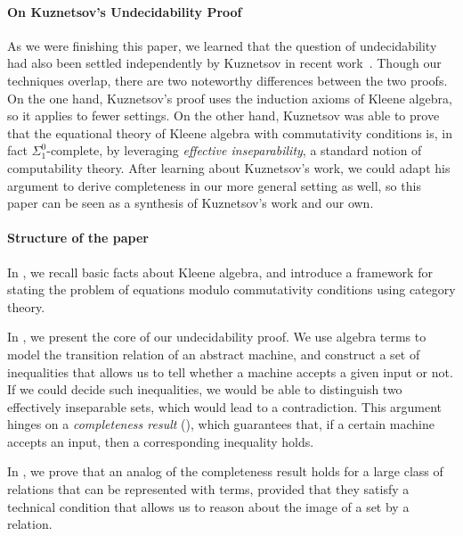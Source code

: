 \documentclass[11pt,a4paper]{amsart}
\theoremstyle{definition}
\begin{document}
\paragraph*{On Kuznetsov's Undecidability Proof}

As we were finishing this paper, we learned that the question of undecidability
had also been settled independently by Kuznetsov in recent
work~\cite{Kuznetsov23}.  Though our techniques overlap, there are two
noteworthy differences between the two proofs.  On the one hand, Kuznetsov's
proof uses the induction axioms of Kleene algebra, so it applies to fewer
settings. On the other hand, Kuznetsov was able to prove that the equational
theory of Kleene algebra with commutativity conditions is, in fact
$ \Sigma _1^0$-complete, by leveraging \emph{effective inseparability}, a standard
notion of computability theory.  After learning about Kuznetsov's work, we could
adapt his argument to derive completeness in our more general setting as well,
so this paper can be seen as a synthesis of Kuznetsov's work and our own.

\paragraph*{Structure of the paper}
In , we recall basic facts about Kleene algebra, and
introduce a framework for stating the problem of equations modulo commutativity
conditions using category theory.

In , we present the core of our undecidability proof. We use
algebra terms to model the transition relation of an abstract machine, and
construct a set of inequalities that allows us to tell whether a machine accepts
a given input or not.  If we could decide such inequalities, we would be able to
distinguish two effectively inseparable sets, which would lead to a contradiction.
This argument hinges on a \emph{completeness result} (),
which guarantees that, if a certain machine accepts an input, then a
corresponding inequality holds.

In , we prove that an
analog of the completeness result holds for a large class of relations that can
be represented with terms, provided that they satisfy a technical condition that
allows us to reason about the image of a set by a relation.
\end{document}
